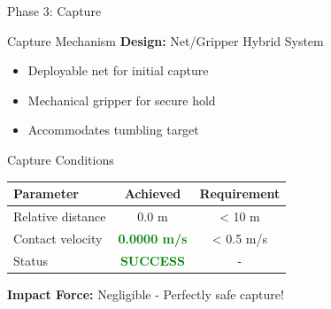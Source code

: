 \documentclass[aspectratio=169]{beamer}
\begin{document}
\begin{frame}{Phase 3: Capture}
\begin{block}{Capture Mechanism}
\textbf{Design:} Net/Gripper Hybrid System
\begin{itemize}
    \item Deployable net for initial capture
    \item Mechanical gripper for secure hold
    \item Accommodates tumbling target
\end{itemize}
\end{block}

\begin{block}{Capture Conditions}
\begin{table}
\centering
\begin{tabular}{lcc}
\toprule
\textbf{Parameter} & \textbf{Achieved} & \textbf{Requirement} \\
\midrule
Relative distance & 0.0 m & < 10 m \\
Contact velocity & \textcolor{green}{\textbf{0.0000 m/s}} & < 0.5 m/s \\
Status & \textcolor{green}{\textbf{SUCCESS}} & - \\
\bottomrule
\end{tabular}
\end{table}
\end{block}

\textbf{Impact Force:} Negligible - Perfectly safe capture!
\end{frame}
\end{document}
